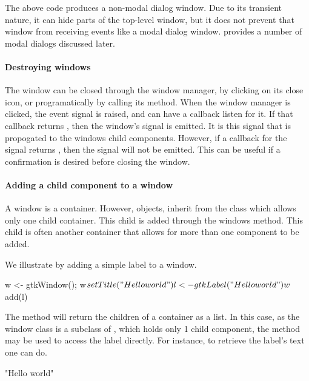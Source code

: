 The above code produces a non-modal dialog window. Due to its
transient nature, it can hide parts of the top-level window, but it
does not prevent that window from receiving events like a modal dialog
window. \GTK\/ provides a number of modal dialogs discussed later.


\paragraph{Destroying windows}
The window can be closed through the window manager, by clicking on
its close icon, or programatically by calling its 
method. When the window manager is clicked, the 
event signal is raised, and can have a callback listen for it. If that callback returns , then the
window's  signal is emitted. It is this signal that is
propogated to the windows child components. However, if a callback for
the  signal returns , then the
 signal will not be emitted. This can be useful if a
confirmation is desired before closing the window.


\paragraph{Adding a child component to a window}
A window is a container. However,  objects, inherit
from the  class which allows only one child
container. This child is added through the windows 
method. This child is often another container that allows for more
than one component to be added.

We illustrate by adding a simple label to a window.
\begin{Schunk}
\begin{Sinput}
 w <- gtkWindow(); w$setTitle("Hello world")
 l <- gtkLabel("Hello world")
 w$add(l)
\end{Sinput}
\end{Schunk}
The method  will return the children of a
container as a list. In this case, as the  window
class is a subclass of , which holds only 1 child
component, the  method may be used to access the label
directly. For instance, to retrieve the label's text one can do.
\begin{Schunk}
\begin{Soutput}
[1] "Hello world"
\end{Soutput}
\end{Schunk}


